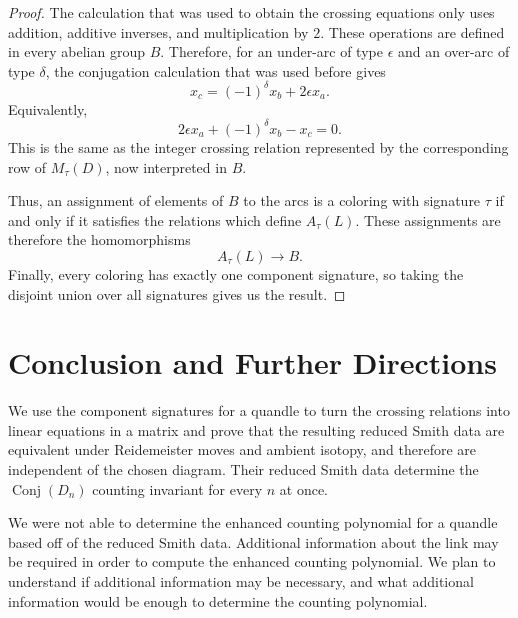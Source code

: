 \documentclass[11pt]{article}
\theoremstyle{definition}
\newcommand{\Conj}{\operatorname{Conj}}
\begin{document}
\begin{proof}
The calculation that was used to obtain the crossing equations only uses addition, additive inverses, and multiplication by $2$. These operations are defined in every abelian group $B$. Therefore, for an under-arc of type $\epsilon$ and an over-arc of type $\delta$, the conjugation calculation that was used before gives
\[
x_c=(-1)^\delta x_b+2\epsilon x_a.
\]
Equivalently,
\[
2\epsilon x_a+(-1)^\delta x_b-x_c=0.
\]
This is the same as the integer crossing relation represented by the corresponding row of $M_\tau(D)$, now interpreted in $B$.

Thus, an assignment of elements of $B$ to the arcs is a coloring with signature $\tau$ if and only if it satisfies the relations which define $A_\tau(L)$. These assignments are therefore the homomorphisms
\[
A_\tau(L)\longrightarrow B.
\]
Finally, every coloring has exactly one component signature, so taking the disjoint union over all signatures gives us the result.
\end{proof}

\section{Conclusion and Further Directions}

We use the component signatures for a quandle to turn the crossing relations into linear equations in a matrix and prove that the resulting reduced Smith data are equivalent under Reidemeister moves and ambient isotopy, and therefore are independent of the chosen diagram. Their reduced Smith data determine the $\Conj(D_n)$ counting invariant for every $n$ at once.

We were not able to determine the enhanced counting polynomial for a quandle~\cite[Definition~7]{navasnelson2008} based off of the reduced Smith data. Additional information about the link may be required in order to compute the enhanced counting polynomial. We plan to understand if additional information may be necessary, and what additional information would be enough to determine the counting polynomial.
\end{document}
